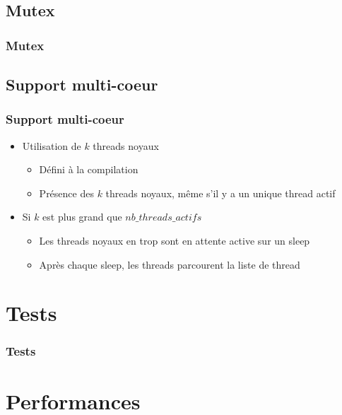 \documentclass{beamer}
\begin{document}
\subsection{Mutex}

\begin{frame}
  \frametitle{Mutex}
\end{frame}

\subsection{Support multi-coeur}

\begin{frame}
  \frametitle{Support multi-coeur}
  \begin{itemize}
    \item Utilisation de $k$ threads noyaux
      \begin{itemize}
      \item Défini à la compilation
      \item Présence des $k$ threads noyaux, même s'il y a un unique thread
        actif
      \end{itemize}
    \item Si $k$ est plus grand que $nb\_threads\_actifs$
      \begin{itemize}
        \item Les threads noyaux en trop sont en attente active sur un sleep
        \item Après chaque sleep, les threads parcourent la liste de thread
      \end{itemize}
  \end{itemize}
\end{frame}

\section{Tests}

\begin{frame}
  \frametitle{Tests}
\end{frame}

\section{Performances}
\end{document}

